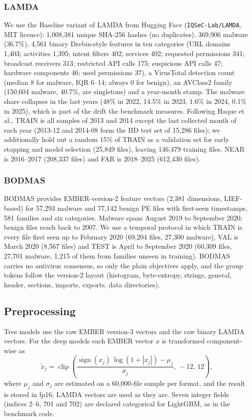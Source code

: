 \documentclass[fleqn,10pt]{wlscirep}
\newcommand{\lgbm}{LightGBM}
\DeclareMathOperator{\clip}{clip}
\DeclareMathOperator{\sign}{sign}
\begin{document}
\subsubsection{LAMDA}
We use the Baseline variant of LAMDA from Hugging Face (\texttt{IQSeC-Lab/LAMDA}, MIT licence): 1,008,381 unique SHA-256 hashes (no duplicates), 369,906 malware (36.7\%), 4,561 binary Drebin-style features in ten categories (URL domains 1,403; activities 1,395; intent filters 402; services 402; requested permissions 341; broadcast receivers 313; restricted API calls 175; suspicious API calls 47; hardware components 46; used permissions 37), a VirusTotal detection count (median 8 for malware, IQR 6--14; always 0 for benign), an AVClass2 family (150,604 malware, 40.7\%, are singletons) and a year-month stamp. The malware share collapses in the last years (48\% in 2022, 14.5\% in 2023, 1.6\% in 2024, 0.1\% in 2025), which is part of the drift the benchmark measures. Following Haque et al.\cite{haque2026lamda}, TRAIN is all samples of 2013 and 2014 except the last collected month of each year (2013-12 and 2014-08 form the IID test set of 15,286 files); we additionally hold out a random 15\% of TRAIN as a validation set for early stopping and model selection (25,849 files), leaving 146,479 training files. NEAR is 2016--2017 (208,337 files) and FAR is 2018--2025 (612,430 files).

\subsubsection{BODMAS}
BODMAS\cite{yang2021bodmas} provides EMBER-version-2 feature vectors (2,381 dimensions, LIEF-based) for 57,293 malware and 77,142 benign PE files with first-seen timestamps, 581 families and six categories. Malware spans August 2019 to September 2020; benign files reach back to 2007. We use a temporal protocol in which TRAIN is every file first seen up to February 2020 (69,204 files, 27,300 malware), VAL is March 2020 (8,567 files) and TEST is April to September 2020 (60,309 files, 27,701 malware, 1,215 of them from families unseen in training). BODMAS carries no antivirus consensus, so only the plain objectives apply, and the group tokens follow the version-2 layout (histogram, byte-entropy, strings, general, header, sections, imports, exports, data directories).

\subsection{Preprocessing}
Tree models use the raw EMBER version-3 vectors and the raw binary LAMDA vectors. For the deep models each EMBER vector $x$ is transformed component-wise as
\begin{equation}
\tilde{x}_j = \clip\!\left( \frac{\sign(x_j)\,\log(1+|x_j|) - \mu_j}{\sigma_j},\, -12,\, 12 \right),
\label{eq:prep}
\end{equation}
where $\mu_j$ and $\sigma_j$ are estimated on a 60,000-file sample per format, and the result is stored in fp16; LAMDA vectors are used as they are. Seven integer fields (indices 2--6, 701 and 702) are declared categorical for \lgbm{}, as in the benchmark code.
\end{document}
